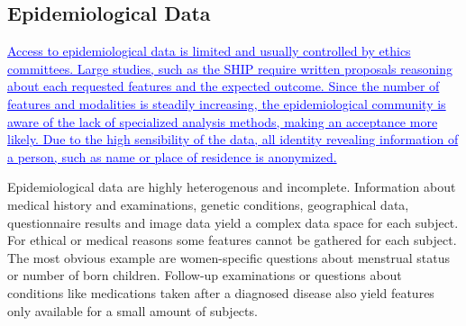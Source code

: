 \documentclass[journal]{style/vgtc} 			          %
\newcommand{\add}[1]{\textcolor{blue}{\uline{#1}}}
\newcommand{\com}[1]{\textcolor{orange}{\uline{#1}}}
\begin{document}
\subsection{Epidemiological Data} \label{EpidemiologicalData}
%
\add{Access to epidemiological data is limited and usually controlled by ethics committees.
%
Large studies, such as the SHIP require written proposals reasoning about each requested features and the expected outcome.
%
Since the number of features and modalities is steadily increasing, the epidemiological community is aware of the lack of specialized analysis methods, making an acceptance more likely.
%
Due to the high sensibility of the data, all identity revealing information of a person, such as name or place of residence is anonymized.
}

Epidemiological data are highly heterogenous and incomplete.
%
Information about medical history and examinations, genetic conditions, geographical data, questionnaire results and image data yield a complex data space for each subject.
%
For ethical or medical reasons some features cannot be gathered for each subject.
%
The most obvious example are women-specific questions about menstrual status or number of born children.
%
Follow-up examinations or questions about conditions like medications taken after a diagnosed disease also yield features only available for a small amount of subjects.
%
\end{document}
